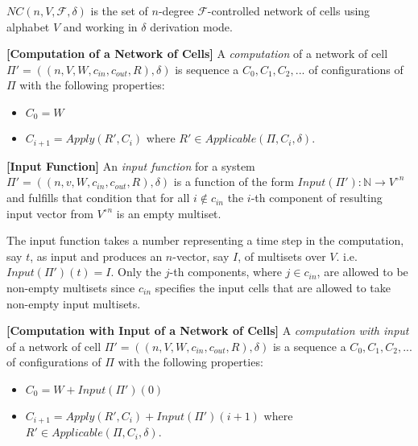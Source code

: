\documentclass[a4paper]{article}
\theoremstyle{definition}
\newcommand{\ra}{\rightarrow}
\begin{document}
$NC(n,V,\mathscr{F},\delta)$ is the set of $n$-degree $\mathscr{F}$-controlled network of cells 
using alphabet $V$ and working in $\delta$ derivation mode.


\label{def-comp1}\textbf{[Computation of a Network of Cells]} A \emph{computation} of
a network of cell $\Pi' = ((n,V,W,c_{in},c_{out},R),\delta)$ is sequence a $C_0,C_1,C_2,...$ of
configurations of $\Pi$ with the following properties:
\begin{itemize}
\item $C_0 = W$
\item $C_{i+1} = Apply(R',C_i)$ where $R' \in Applicable(\Pi,C_i,\delta)$.
\end{itemize}


\label{def-input} \textbf{[Input Function]} An \emph{input function} for a system 
$\Pi'=((n,v,W,c_{in},c_{out},R),\delta)$  is a function of the form $Input(\Pi'): \mathbb{N} \ra 
{V^{\circ}}^{n}$ and fulfills that condition that for all $i \notin c_{in}$ the $i$-th component of 
resulting input vector from ${V^{\circ}}^n$ is an empty multiset.

The input function takes a number representing a time step in the computation, say $t$, as input 
and produces an $n$-vector, say $I$, of multisets over $V$. i.e. $Input(\Pi')(t) = I$. Only the
$j$-th components, where $j \in c_{in}$, are allowed to be non-empty multisets since $c_{in}$
specifies the input cells that are allowed to take non-empty input multisets.


\label{def-comp2}\textbf{[Computation with Input of a Network of Cells]} A 
\emph{computation with input} of a network of cell $\Pi' = ((n,V,W,c_{in},c_{out},R),\delta)$ is a 
sequence a $C_0,C_1,C_2,...$ of configurations of $\Pi$ with the following properties:
\begin{itemize}
\item $C_0 = W + Input(\Pi')(0)$
\item $C_{i+1} = Apply(R',C_i) + Input(\Pi')(i+1)$ where $R' \in Applicable(\Pi, C_i, \delta)$.
\end{itemize}
\end{document}
